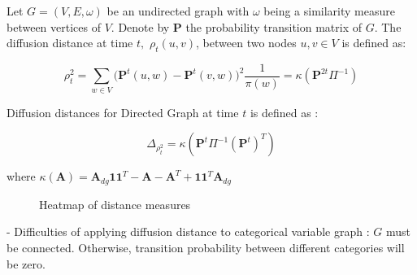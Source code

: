 \documentclass[12pt]{report}
\begin{document}
  Let $G = (V, E, \omega)$ be an undirected graph with $\omega$ being a similarity measure between vertices of $V.$ Denote by $\textbf{P}$ the probability transition matrix of $G.$ The diffusion distance at time $t,$ $\rho_{t}(u,v)$, between two nodes $u,v \in V$ is defined as:
  
  $$\rho^2_{t} = \sum\limits_{w \in V}\big( \textbf{P}^{t}(u,w) - \textbf{P}^{t}(v,w) \big)^2 \frac{1}{\pi(w)} =  \kappa(\textbf{P}^{2t} \Pi^{-1} )$$

 
Diffusion distances for Directed Graph at time $t$ is defined as :

$$\Delta_{\rho^{2}_{t}} = \kappa(\textbf{P}^{t} \Pi^{-1} (\textbf{P}^{t})^{T} )$$
 
where $\kappa(\textbf{A}) = \textbf{A}_{dg} \textbf{1} \textbf{1}^{T} - \textbf{A} - \textbf{A}^{T} + \textbf{1} \textbf{1}^{T} \textbf{A}_{dg}$ 

 
\begin{figure}[H]
\captionsetup{format=plain}
\centering
{}
\caption{Heatmap of distance measures}
\label{fig:dist}    
\end{figure} 
 
  
- Difficulties of applying diffusion distance to categorical variable graph : $G$ must be connected. Otherwise, transition probability between different categories will be zero.  

 
\end{document}
